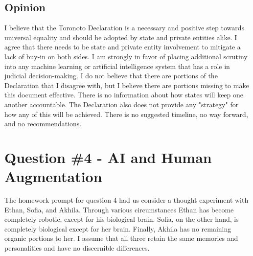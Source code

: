 \documentclass[
	letterpaper, %
]{jdf}
\begin{document}
\subsection{Opinion}
I believe that the Toronoto Declaration is a necessary and positive step towards universal equality and should be adopted by state and private entities alike. I agree that there needs to be state and private entity involvement to mitigate a lack of buy-in on both sides. I am strongly in favor of placing additional scrutiny into any machine learning or artificial intelligence system that has a role in judicial decision-making. I do not believe that there are portions of the Declaration that I disagree with, but I believe there are portions missing to make this document effective. There is no information about how states will keep one another accountable. The Declaration also does not provide any "strategy" for how any of this will be achieved. There is no suggested timeline, no way forward, and no recommendations.
\section{Question \#4 - AI and Human Augmentation}
The homework prompt for question 4 had us consider a thought experiment with Ethan, Sofia, and Akhila. Through various circumstances Ethan has become completely robotic, except for his biological brain. Sofia, on the other hand, is completely biological except for her brain. Finally, Akhila has no remaining organic portions to her. I assume that all three retain the same memories and personalities and have no discernible differences. 


\end{document}
